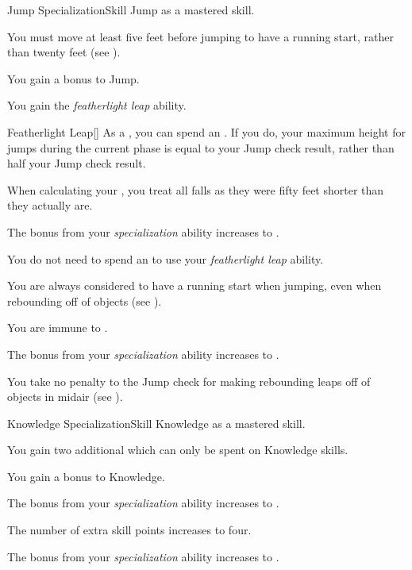     \begin{feat}{Jump Specialization}{Skill}
        \featpre Jump as a mastered skill.

         You must move at least five feet before jumping to have a running start, rather than twenty feet (see ).

         You gain a  bonus to Jump.

         You gain the \textit{featherlight leap} ability.
        \begin{ability}{Featherlight Leap}[]
            As a , you can spend an .
            If you do, your maximum height for jumps during the current phase is equal to your Jump check result, rather than half your Jump check result.
        \end{ability}

         When calculating your , you treat all falls as they were fifty feet shorter than they actually are.

         The bonus from your \textit{specialization} ability increases to .

         You do not need to spend an  to use your \textit{featherlight leap} ability.

         You are always considered to have a running start when jumping, even when rebounding off of objects (see ).

         You are immune to . 

         The bonus from your \textit{specialization} ability increases to .

         You take no penalty to the Jump check for making rebounding leaps off of objects in midair (see ).
    \end{feat}

    \begin{feat}{Knowledge Specialization}{Skill}
        \featpre Knowledge as a mastered skill.

         You gain two additional  which can only be spent on Knowledge skills.

         You gain a  bonus to Knowledge.

         The bonus from your \textit{specialization} ability increases to .

         The number of extra skill points increases to four.

         The bonus from your \textit{specialization} ability increases to .
    \end{feat}

